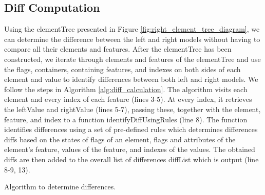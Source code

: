 \subsection{Diff Computation}
\label{sec:diff_computation}
Using the \textsf{elementTree} presented in Figure \ref{fig:right_element_tree_diagram}, we can determine the difference between the left and right models without having to compare all their elements and features. After the \textsf{elementTree} has been constructed, we iterate through elements and features of the \textsf{elementTree} and use the flags, containers, containing features, and indexes on both sides of each element and value to identify differences between both left and right models. We follow the steps in Algorithm \ref{alg:diff_calculation}. The algorithm visits each element and every index of each feature (lines 3-5). At every index, it retrieves the \textsf{leftValue} and \textsf{rightValue} (lines 5-7), passing these, together with the \textsf{element}, \textsf{feature}, and \textsf{index} to a function \textsf{identifyDiffUsingRules} (line 8). The function identifies differences using a set of pre-defined rules which determines differences \textsf{diffs} based on the states of flags of an element, flags and attributes of the element's feature, values of the feature, and indexes of the values. The obtained \textsf{diffs} are then added to the overall list of differences \textsf{diffList} which is output (line 8-9, 13). 

\IncMargin{1.5em}
\begin{algorithm}[H]
    \begin{footnotesize}
    \end{footnotesize}
    \caption{Algorithm to determine differences.}
    \label{alg:diff_calculation}
\end{algorithm}
\DecMargin{1.5em}

